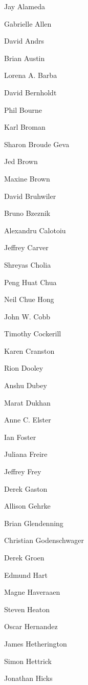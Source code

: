 \documentclass[11pt, oneside]{amsart}
\begin{document}
\begin{multicols}{3}
\setlength{\parindent}{0pt}

Jay Alameda

Gabrielle Allen

David Andrs

Brian Austin

Lorena A. Barba

David Bernholdt

Phil Bourne

Karl Broman

Sharon Broude Geva

Jed Brown

Maxine Brown

David Bruhwiler

Bruno Bzeznik

Alexandru Calotoiu

Jeffrey Carver

Shreyas Cholia

Peng Huat Chua

Neil Chue Hong %

John W. Cobb

Timothy Cockerill

Karen Cranston

Rion Dooley

Anshu Dubey

Marat Dukhan

Anne C. Elster

Ian Foster

Juliana Freire

Jeffrey Frey

Derek Gaston

Allison Gehrke

Brian Glendenning

Christian Godenschwager

Derek Groen

Edmund Hart

Magne Haveraaen

Steven Heaton

Oscar Hernandez

James Hetherington

Simon Hettrick

Jonathan Hicks


\end{multicols}
\end{document}
